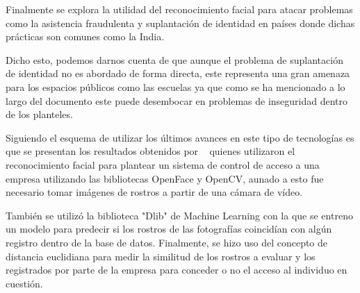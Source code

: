 Finalmente se explora la utilidad del reconocimiento facial para atacar problemas como la asistencia fraudulenta y suplantación de identidad en países donde dichas prácticas son comunes como la India.

Dicho esto, podemos darnos cuenta de que aunque el problema de suplantación de identidad no es abordado de forma directa, este representa una gran amenaza para los espacios públicos como las escuelas ya que como se ha mencionado a lo largo del documento este puede desembocar en problemas de inseguridad dentro de los planteles.

Siguiendo el esquema de utilizar los últimos avances en este tipo de tecnologías es que se presentan los resultados obtenidos por ~\cite{RecFacPython} quienes utilizaron el reconocimiento facial para plantear un sistema de control de acceso a una empresa utilizando las bibliotecas OpenFace y OpenCV, aunado a esto fue necesario tomar imágenes de rostros a partir de una cámara de vídeo.

También se utilizó la biblioteca "Dlib" de Machine Learning con la que se entreno un modelo para predecir si los rostros de las fotografías coincidían con algún registro dentro de la base de datos. Finalmente, se hizo uso del concepto de distancia euclidiana para medir la similitud de los rostros a evaluar y los registrados por parte de la empresa para conceder o no el acceso al individuo en cuestión.





